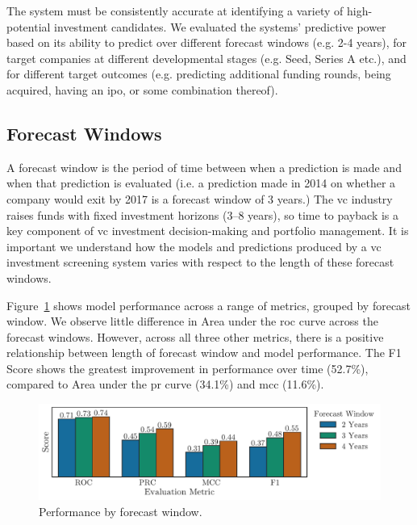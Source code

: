 \documentclass[../thesis/thesis.tex]{subfiles}
\begin{document}
The system must be consistently accurate at identifying a variety of high-potential investment candidates. We evaluated the systems' predictive power based on its ability to predict over different forecast windows (e.g. 2-4 years), for target companies at different developmental stages (e.g. Seed, Series A etc.), and for different target outcomes (e.g. predicting additional funding rounds, being acquired, having an \gls{ipo}, or some combination thereof).

\subsection{Forecast Windows}

A forecast window is the period of time between when a prediction is made and when that prediction is evaluated (i.e. a prediction made in 2014 on whether a company would exit by 2017 is a forecast window of 3 years.) The \gls{vc} industry raises funds with fixed investment horizons (3--8 years), so time to payback is a key component of \gls{vc} investment decision-making and portfolio management. It is important we understand how the models and predictions produced by a \gls{vc} investment screening system varies with respect to the length of these forecast windows.

Figure~\ref{fig:evaluation:performance_window} shows model performance across a range of metrics, grouped by forecast window. We observe little difference in Area under the \gls{roc} curve across the forecast windows. However, across all three other metrics, there is a positive relationship between length of forecast window and model performance. The F1 Score shows the greatest improvement in performance over time (52.7\%), compared to Area under the \gls{pr} curve (34.1\%) and \gls{mcc} (11.6\%).

\begin{figure}[!htb]
    \centering
    \includegraphics[width=\textwidth]{../figures/evaluation/performance_window}
    \caption[Performance by forecast window]{Performance by forecast window.}
    \label{fig:evaluation:performance_window}
\end{figure}
\end{document}
